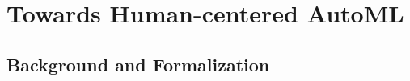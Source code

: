 \documentclass[a4paper,12pt,times,numbered,print,index]{Classes/PhDThesisPSnPDF}
\begin{document}



\part{Towards Human-centered AutoML}\label{part:automl}


\chapter{Background and Formalization}
\label{automl-chap:background}
\end{document}
